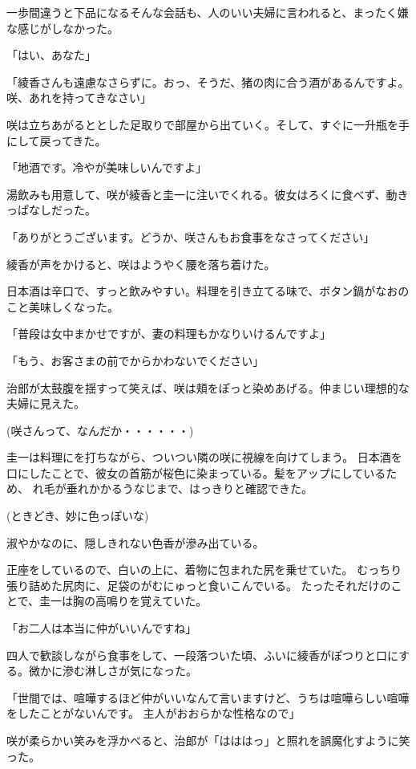 ﻿\documentclass[book,tate]{jlreq}
\begin{document}
一歩間違うと下品になるそんな会話も、人のいい夫婦に言われると、まったく嫌な感じがしなかった。

「はい、あなた」

「綾香さんも遠慮なさらずに。おっ、そうだ、猪の肉に合う酒があるんですよ。 咲、あれを持ってきなさい」

咲は立ちあがるととした足取りで部屋から出ていく。そして、すぐに一升瓶を手にして戻ってきた。

「地酒です。冷やが美味しいんですよ」

湯飲みも用意して、咲が綾香と圭一に注いでくれる。彼女はろくに食べず、動きっぱなしだった。

「ありがとうございます。どうか、咲さんもお食事をなさってください」

綾香が声をかけると、咲はようやく腰を落ち着けた。

日本酒は辛口で、すっと飲みやすい。料理を引き立てる味で、ボタン鍋がなおのこと美味しくなった。

「普段は女中まかせですが、妻の料理もかなりいけるんですよ」

「もう、お客さまの前でからかわないでください」

治郎が太鼓腹を揺すって笑えば、咲は頬をぽっと染めあげる。仲まじい理想的な夫婦に見えた。

(咲さんって、なんだか・・・・・・)

圭一は料理にを打ちながら、ついつい隣の咲に視線を向けてしまう。
日本酒を口にしたことで、彼女の首筋が桜色に染まっている。髪をアップにしているため、
れ毛が垂れかかるうなじまで、はっきりと確認できた。

(ときどき、妙に色っぽいな)

淑やかなのに、隠しきれない色香が滲み出ている。

正座をしているので、白いの上に、着物に包まれた尻を乗せていた。
むっちり張り詰めた尻肉に、足袋のがむにゅっと食いこんでいる。
たったそれだけのことで、圭一は胸の高鳴りを覚えていた。

「お二人は本当に仲がいいんですね」

四人で歓談しながら食事をして、一段落ついた頃、ふいに綾香がぽつりと口にする。微かに滲む淋しさが気になった。

「世間では、喧嘩するほど仲がいいなんて言いますけど、うちは喧嘩らしい喧嘩をしたことがないんです。 
主人がおおらかな性格なので」

咲が柔らかい笑みを浮かべると、治郎が「はははっ」と照れを誤魔化すように笑った。
\end{document}
